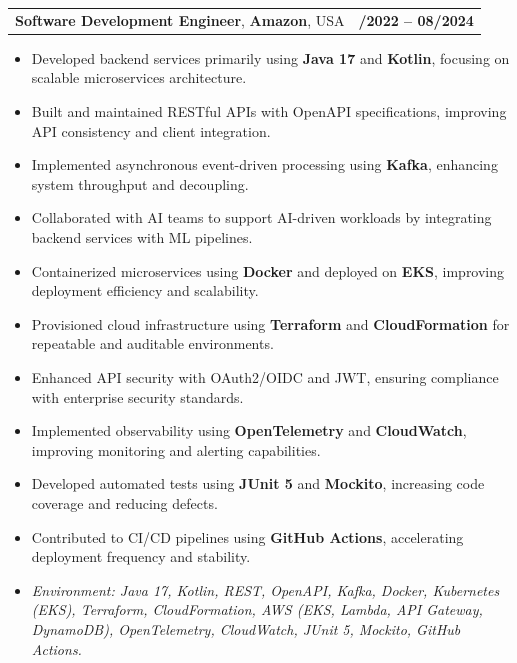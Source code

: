 \documentclass[letterpaper,11pt]{article}
\makeatletter
\newcommand{\resumeItem}[1]{
  \item\footnotesize{
    {#1 \vspace{-2pt}}
  }
}
\newcommand{\resumeSubheading}[4]{
  \vspace{-2pt}\item
    \begin{tabular*}{1.0\textwidth}[t]{l@{\extracolsep{\fill}}r}
      \textbf{\fontsize{10pt}{14pt}\selectfont #3}, \textbf{\fontsize{10pt}{14pt}\selectfont #1}, \fontsize{10pt}{14pt}\selectfont #4 & \textbf{\fontsize{10pt}{14pt}\selectfont #2} \\
    \end{tabular*}\vspace{-7pt}
}
\newcommand{\resumeItemListStart}{\begin{itemize}[leftmargin=*]}
\newcommand{\resumeItemListEnd}{\end{itemize}\vspace{-5pt}}
\makeatother
\begin{document}
\resumeSubheading
{Amazon}{10/2022 -- 08/2024}
{Software Development Engineer}{USA}
\resumeItemListStart
  \resumeItem{Developed backend services primarily using \textbf{Java 17} and \textbf{Kotlin}, focusing on scalable microservices architecture.}
  \resumeItem{Built and maintained RESTful APIs with OpenAPI specifications, improving API consistency and client integration.}
  \resumeItem{Implemented asynchronous event-driven processing using \textbf{Kafka}, enhancing system throughput and decoupling.}
  \resumeItem{Collaborated with AI teams to support AI-driven workloads by integrating backend services with ML pipelines.}
  \resumeItem{Containerized microservices using \textbf{Docker} and deployed on \textbf{EKS}, improving deployment efficiency and scalability.}
  \resumeItem{Provisioned cloud infrastructure using \textbf{Terraform} and \textbf{CloudFormation} for repeatable and auditable environments.}
  \resumeItem{Enhanced API security with OAuth2/OIDC and JWT, ensuring compliance with enterprise security standards.}
  \resumeItem{Implemented observability using \textbf{OpenTelemetry} and \textbf{CloudWatch}, improving monitoring and alerting capabilities.}
  \resumeItem{Developed automated tests using \textbf{JUnit 5} and \textbf{Mockito}, increasing code coverage and reducing defects.}
  \resumeItem{Contributed to CI/CD pipelines using \textbf{GitHub Actions}, accelerating deployment frequency and stability.}
  \resumeItem{\textit{Environment: Java 17, Kotlin, REST, OpenAPI, Kafka, Docker, Kubernetes (EKS), Terraform, CloudFormation, AWS (EKS, Lambda, API Gateway, DynamoDB), OpenTelemetry, CloudWatch, JUnit 5, Mockito, GitHub Actions.}}
\resumeItemListEnd
\end{document}
